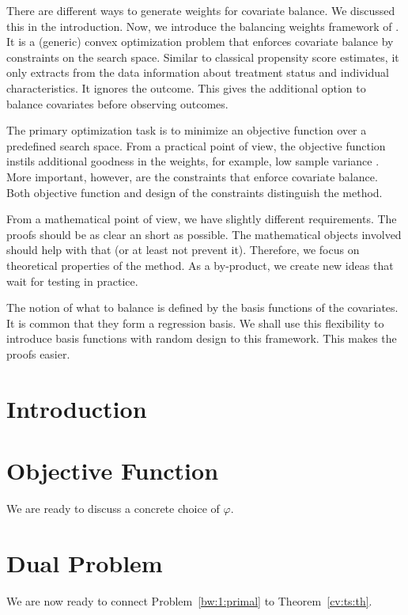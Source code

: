 There are different ways
to generate weights for covariate balance.
%
We discussed this in the introduction.
%
Now, we introduce the balancing weights framework of \cite{Wang2019}.
%
It is a (generic) convex optimization problem
that enforces covariate balance by constraints on the search space.
%
Similar to classical propensity score estimates, it only
extracts from the data information about treatment status and individual characteristics.
%
It ignores the outcome.
%
This gives the additional option to balance covariates before observing outcomes.

%
The primary optimization task is to minimize an objective function
over a predefined search space.
%
From a practical point of view, the objective function
instils additional goodness in the weights, 
for example, 
low sample variance \cite[Introduction]{Zubizarreta2015}. 
%
%
More important, however, are the constraints that enforce covariate balance.
%
Both objective function and design of the constraints distinguish the method.
%

From a mathematical point of view,
we have slightly different requirements.
%
The proofs should be as clear an short as possible.
%
The mathematical objects involved should help with that
(or at least not prevent it).
%
Therefore, we focus on theoretical properties
of the method.
%
As a by-product, we create new ideas that wait for testing in practice.

%
The notion of what to balance is defined by the basis functions of the covariates.
%
It is common that they form a regression basis.
%
We shall use this flexibility to introduce basis functions with random design to this framework.
%
This makes the proofs easier.
\section{Introduction}


\section{Objective Function}

We are ready to discuss a concrete choice of $\varphi$.


\newpage 
\section{Dual Problem}
We are now ready to connect 
Problem~\ref{bw:1:primal} to Theorem~\ref{cv:ts:th}.


